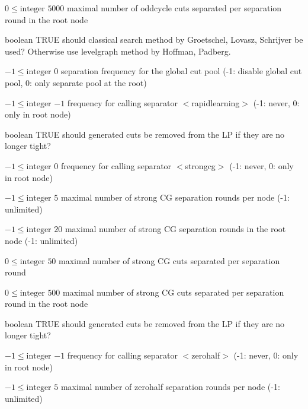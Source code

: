 %
{$0\leq\textrm{integer}$}%
{$5000$}%
{maximal number of oddcycle cuts separated per separation round in the root node}%
{}

%
{boolean}%
{TRUE}%
{should classical search method by Groetschel, Lovasz, Schrijver be used? Otherwise use levelgraph method by Hoffman, Padberg.}%
{}

%
{$-1\leq\textrm{integer}$}%
{$0$}%
{separation frequency for the global cut pool (-1: disable global cut pool, 0: only separate pool at the root)}%
{}

%
{$-1\leq\textrm{integer}$}%
{$-1$}%
{frequency for calling separator $<$rapidlearning$>$ (-1: never, 0: only in root node)}%
{}

%
{boolean}%
{TRUE}%
{should generated cuts be removed from the LP if they are no longer tight?}%
{}

%
{$-1\leq\textrm{integer}$}%
{$0$}%
{frequency for calling separator $<$strongcg$>$ (-1: never, 0: only in root node)}%
{}

%
{$-1\leq\textrm{integer}$}%
{$5$}%
{maximal number of strong CG separation rounds per node (-1: unlimited)}%
{}

%
{$-1\leq\textrm{integer}$}%
{$20$}%
{maximal number of strong CG separation rounds in the root node (-1: unlimited)}%
{}

%
{$0\leq\textrm{integer}$}%
{$50$}%
{maximal number of strong CG cuts separated per separation round}%
{}

%
{$0\leq\textrm{integer}$}%
{$500$}%
{maximal number of strong CG cuts separated per separation round in the root node}%
{}

%
{boolean}%
{TRUE}%
{should generated cuts be removed from the LP if they are no longer tight?}%
{}

%
{$-1\leq\textrm{integer}$}%
{$-1$}%
{frequency for calling separator $<$zerohalf$>$ (-1: never, 0: only in root node)}%
{}

%
{$-1\leq\textrm{integer}$}%
{$5$}%
{maximal number of zerohalf separation rounds per node (-1: unlimited)}%
{}

